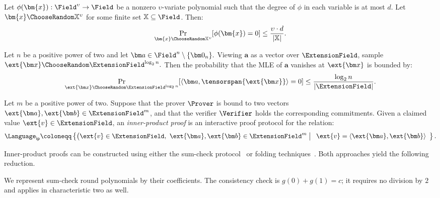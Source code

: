\begin{lemma}
\label{lemma:schwartz}
Let
\( \phi(\bm{x}) : \Field^\upsilon \to \Field \) be a nonzero \( \upsilon \)-variate polynomial such that the degree of \( \phi \) in each variable is at most \( d \). Let \( \bm{x} \ChooseRandom \mathbb{X}^{\upsilon} \) for some finite set \( \mathbb{X} \subseteq \Field \). Then:
\[
    \Pr_{\bm{x} \ChooseRandom \mathbb{X}^{\upsilon}}\!\left[ \phi(\bm{x}) = 0 \right]
    \le \frac{\upsilon \cdot d}{|\mathbb{X}|}.
\]
\end{lemma}

\begin{corollary}
\label{corollary:schwartz}
Let \(n\) be a positive power of two and let
\(
    \bm a\in\Field^n\setminus\{\bm 0_n\}.
\)
Viewing \(\bm a\) as a vector over \(\ExtensionField\), sample
\(
    \ext{\bm x}
    \ChooseRandom
    \ExtensionField^{\log_2 n}.
\)
Then the probability that the MLE of \(\bm a\)
vanishes at \(\ext{\bm x}\) is bounded by:
\[
    \Pr_{\ext{\bm x}\ChooseRandom
        \ExtensionField^{\log_2 n}}
    \!\left[
        \left\langle
            \bm a,
            \tensorspan{\ext{\bm x}}
        \right\rangle
        =0
    \right]
    \leq
    \frac{\log_2 n}{\lvert\ExtensionField\rvert}.
\]
\end{corollary}

\begin{definition}
\label{def:ip}
Let \(m\) be a positive power of two. Suppose that the prover
\(\Prover\) is bound to two vectors
\(\ext{\bm a},\ext{\bm b}\in\ExtensionField^m\), and that the
verifier \(\Verifier\) holds the corresponding commitments.
Given a claimed value \(\ext{v}\in\ExtensionField\), an
\emph{inner-product proof} is an interactive proof protocol for the
relation:
\[
    \Language_{\mathsf{ip}}
    \coloneqq
    \left\{
        \bigl(\ext{v}\in \ExtensionField,~      \ext{\bm a},\ext{\bm b}\in\ExtensionField^m
        \;\middle|\;
        \begin{array}{l}
            \ext{v}
            =\langle\ext{\bm a},\ext{\bm b}\rangle
        \end{array}
    \right\}.
\]
\end{definition}

Inner-product proofs can be constructed using either the
sum-check protocol~\cite{crypto/Thaler13} or folding
techniques~\cite{asiacrypt/CCYY25}. Both approaches yield the
following reduction.

We represent sum-check round polynomials by their coefficients.
The consistency check is \(g(0)+g(1)=c\); it requires no
division by \(2\) and applies in characteristic two as well.

